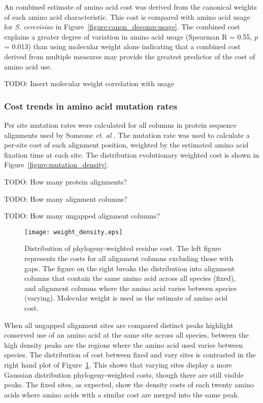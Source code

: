 An combined estimate of amino acid cost was derived from the canonical weights of each amino acid characteristic. This cost is compared with amino acid usage for \emph{S. cerevisiae} in Figure~\ref{figure:canon_decomp:usage}. The combined cost explains a greater degree of variation in amino acid usage (Spearman R = 0.55, $p$ = 0.013) than using molecular weight alone indicating that a combined cost derived from multiple measures may provide the greatest predictor of the cost of amino acid use.

TODO: Insert molecular weight correlation with usage

\subsubsection{Cost trends in amino acid mutation rates}

Per site mutation rates were calculated for all columns in protein sequence alignments used by Someone \emph{et. al} \cite{wall2005}. The mutation rate was used to calculate a per-site cost of each alignment position, weighted by the estimated amino acid fixation time at each site. The distribution evolutionary weighted cost is shown in Figure~\vref{figure:mutation_density}.

TODO: How many protein alignments?

TODO: How many alignment columns?

TODO: How many ungapped alignment columns?

\begin{figure}
  \centering
  \texttt{[image: weight\_density.eps]}
  \caption[Distribution of phylogeny-weighted residue cost.]{Distribution of phylogeny-weighted residue cost. The left figure represents the costs for all alignment columns excluding those with gaps. The figure on the right breaks the distribution into alignment columns that contain the same amino acid across all species (fixed), and alignment columns where the amino acid varies between species (varying). Molecular weight is used as the estimate of amino acid cost.}
  \label{figure:mutation_density}
\end{figure}

When all ungapped alignment sites are compared distinct peaks highlight conserved use of an amino acid at the same site across all species, between the high density peaks are the regions where the amino acid used varies between species. The distribution of cost between fixed and vary sites is contrasted in the right hand plot of Figure~\ref{figure:mutation_density}. This shows that varying sites display a more Gaussian distribution phylogeny-weighted costs, though there are still visible peaks. The fixed sites, as expected, show the density costs of each twenty amino acids where amino acids with a similar cost are merged into the same peak.

